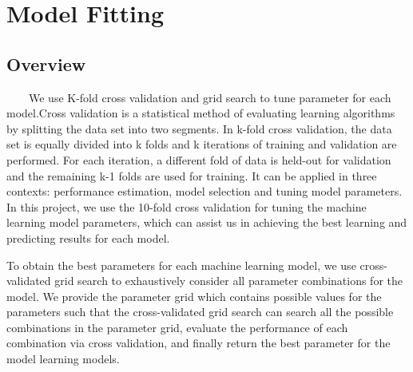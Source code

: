 \documentclass[11pt]{article}
\begin{document}
\section{Model Fitting}
\subsection{Overview}
\ \ \ \ We use K-fold cross validation and grid search to tune parameter for each model.Cross validation is a statistical method of evaluating learning algorithms by splitting the data set into two segments. In k-fold cross validation, the data set is equally divided into k folds and k iterations of training and validation are performed. For each iteration, a different fold of data is held-out for validation and the remaining k-1 folds are used for training. It can be applied in three contexts: performance estimation, model selection and tuning model parameters\cite{cv}. In this project, we use the 10-fold cross validation for tuning the machine learning model parameters, which can assist us in achieving the best learning and predicting results for each model.
\par To obtain the best parameters for each machine learning model, we use cross-validated grid search to exhaustively consider all parameter combinations for the model. We provide the parameter grid which contains possible values for the parameters such that the cross-validated grid search can search all the possible combinations in the parameter grid, evaluate the performance of each combination via cross validation, and finally return the best parameter for the model learning models. 
\end{document}
